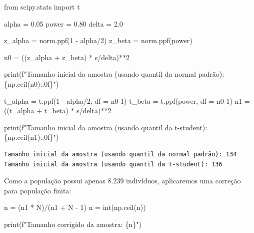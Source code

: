 \documentclass[
  letterpaper,
  DIV=11,
  numbers=noendperiod]{scrreprt}
\newenvironment{Shaded}{\begin{snugshade}}{\end{snugshade}}
\newcommand{\BuiltInTok}[1]{\textcolor[rgb]{0.00,0.23,0.31}{#1}}
\newcommand{\DecValTok}[1]{\textcolor[rgb]{0.68,0.00,0.00}{#1}}
\newcommand{\FloatTok}[1]{\textcolor[rgb]{0.68,0.00,0.00}{#1}}
\newcommand{\ImportTok}[1]{\textcolor[rgb]{0.00,0.46,0.62}{#1}}
\newcommand{\NormalTok}[1]{\textcolor[rgb]{0.00,0.23,0.31}{#1}}
\newcommand{\OperatorTok}[1]{\textcolor[rgb]{0.37,0.37,0.37}{#1}}
\newcommand{\SpecialCharTok}[1]{\textcolor[rgb]{0.37,0.37,0.37}{#1}}
\newcommand{\SpecialStringTok}[1]{\textcolor[rgb]{0.13,0.47,0.30}{#1}}
\begin{document}
\begin{Shaded}
\begin{Highlighting}[]
\ImportTok{from}\NormalTok{ scipy.stats }\ImportTok{import}\NormalTok{ t}

\NormalTok{alpha }\OperatorTok{=} \FloatTok{0.05} 
\NormalTok{power }\OperatorTok{=} \FloatTok{0.80} 
\NormalTok{delta }\OperatorTok{=} \FloatTok{2.0} 

\NormalTok{z\_alpha }\OperatorTok{=}\NormalTok{ norm.ppf(}\DecValTok{1} \OperatorTok{{-}}\NormalTok{ alpha}\OperatorTok{/}\DecValTok{2}\NormalTok{) }
\NormalTok{z\_beta }\OperatorTok{=}\NormalTok{ norm.ppf(power) }

\NormalTok{n0 }\OperatorTok{=}\NormalTok{ ((z\_alpha }\OperatorTok{+}\NormalTok{ z\_beta) }\OperatorTok{*}\NormalTok{ s}\OperatorTok{/}\NormalTok{delta)}\OperatorTok{**}\DecValTok{2}

\BuiltInTok{print}\NormalTok{(}\SpecialStringTok{f"Tamanho inicial da amostra (usando quantil da normal padrão): }\SpecialCharTok{\{}\NormalTok{np}\SpecialCharTok{.}\NormalTok{ceil(n0)}\SpecialCharTok{:.0f\}}\SpecialStringTok{"}\NormalTok{)}


\NormalTok{t\_alpha }\OperatorTok{=}\NormalTok{ t.ppf(}\DecValTok{1} \OperatorTok{{-}}\NormalTok{ alpha}\OperatorTok{/}\DecValTok{2}\NormalTok{, df }\OperatorTok{=}\NormalTok{ n0}\OperatorTok{{-}}\DecValTok{1}\NormalTok{)}
\NormalTok{t\_beta }\OperatorTok{=}\NormalTok{ t.ppf(power, df }\OperatorTok{=}\NormalTok{ n0}\OperatorTok{{-}}\DecValTok{1}\NormalTok{)}
\NormalTok{n1 }\OperatorTok{=}\NormalTok{ ((t\_alpha }\OperatorTok{+}\NormalTok{ t\_beta) }\OperatorTok{*}\NormalTok{ s}\OperatorTok{/}\NormalTok{delta)}\OperatorTok{**}\DecValTok{2} 

\BuiltInTok{print}\NormalTok{(}\SpecialStringTok{f"Tamanho inicial da amostra (usando quantil da t{-}student): }\SpecialCharTok{\{}\NormalTok{np}\SpecialCharTok{.}\NormalTok{ceil(n1)}\SpecialCharTok{:.0f\}}\SpecialStringTok{"}\NormalTok{)}
\end{Highlighting}
\end{Shaded}

\begin{verbatim}
Tamanho inicial da amostra (usando quantil da normal padrão): 134
Tamanho inicial da amostra (usando quantil da t-student): 136
\end{verbatim}

Como a população possui apenas 8.239 indivíduos, aplicaremos uma
correção para população finita:

\begin{Shaded}
\begin{Highlighting}[]
\NormalTok{n }\OperatorTok{=}\NormalTok{ (n1 }\OperatorTok{*}\NormalTok{ N)}\OperatorTok{/}\NormalTok{(n1 }\OperatorTok{+}\NormalTok{ N }\OperatorTok{{-}} \DecValTok{1}\NormalTok{) }
\NormalTok{n }\OperatorTok{=} \BuiltInTok{int}\NormalTok{(np.ceil(n)) }

\BuiltInTok{print}\NormalTok{(}\SpecialStringTok{f"Tamanho corrigido da amostra: }\SpecialCharTok{\{}\NormalTok{n}\SpecialCharTok{\}}\SpecialStringTok{"}\NormalTok{)}
\end{Highlighting}
\end{Shaded}
\end{document}

